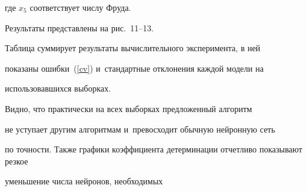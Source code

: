






\noindent

где $x_5$ соответствует числу Фруда.

Результаты представлены на рис.~11--13.













Таблица суммирует результаты вычислительного эксперимента, в ней 

показаны ошибки~(\ref{cv}) и~стандартные отклонения каждой модели на 

использовавшихся выборках.

Видно, что практически на всех выборках предложенный алгоритм 

не уступает другим алгоритмам и~превосходит обычную нейронную сеть 

по точ\-ности. Также графики коэффициента детерминации отчетливо показывают резкое 

уменьшение числа нейронов, необходимых\hspace*{69.5mm}\linebreak 

